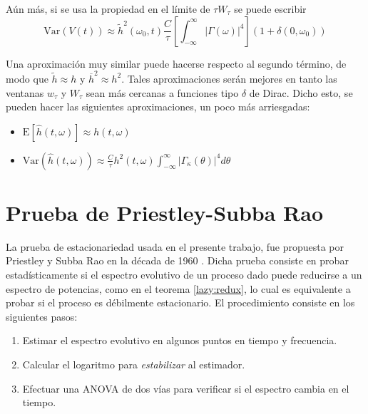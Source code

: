 \documentclass[12pt,letterpaper]{book}
\newcommand{\intR}{\int_{-\infty}^{\infty}}
\newcommand{\dirac}{$\delta$  de Dirac}
\newcommand{\est}[1]{\widehat{ #1 }}
\newcommand{\E}[1]{\mathrm{E}\left[ #1 \right]}
\newcommand{\Var}[1]{\mathrm{Var}\left( #1 \right)}
\newcommand{\abso}[1]{\left| #1 \right|}
\begin{document}
Aún más, si se usa la propiedad en el límite de $\tau W_\tau$ se puede escribir
\begin{equation}
\Var{V(t)} \approx 
\widetilde{h}^{2}(\omega_0,t) \frac{C}{\tau} \left[ \intR \abso{\Gamma(\omega)}^{4} \right] (1+\delta(0,\omega_0))
\end{equation}

Una aproximación muy similar 
puede hacerse respecto al segundo término, de modo que $\widetilde{h}\approx h$ y 
$\overline{h}^{2}\approx h^{2}$.
Tales aproximaciones serán mejores en tanto las ventanas $w_{\tau}$ y $W_{\tau}$ sean más 
cercanas a funciones tipo \dirac.
Dicho esto, se pueden hacer las siguientes aproximaciones, un poco más arriesgadas:
\begin{itemize}
\item $\displaystyle \E{\est{h}(t,\omega)} \approx h(t,\omega)$
\item $\displaystyle \Var{\est{h}(t,\omega)} \approx 
\frac{C}{\tau} h^{2}(t,\omega) \intR \abso{\Gamma_\kappa (\theta)}^{4} d\theta$
\end{itemize}


\section{Prueba de Priestley-Subba Rao}
\label{sec:psr}

La prueba de estacionariedad usada en el presente trabajo, fue propuesta por Priestley y Subba Rao en la década de 1960 \cite{Priestley69}.
%
Dicha prueba consiste en probar estadísticamente si el espectro evolutivo de un proceso dado puede reducirse a un espectro de potencias, como en el teorema \ref{lazy:redux}, lo cual es equivalente a probar si el proceso es débilmente estacionario.
%
%
El procedimiento consiste en los siguientes pasos:
\begin{enumerate}
\item Estimar el espectro evolutivo en algunos puntos en tiempo y frecuencia.
\item Calcular el logaritmo para \textit{estabilizar} al estimador.
\item Efectuar una ANOVA de dos vías para verificar si el espectro cambia en el tiempo.
\end{enumerate}
\end{document}

